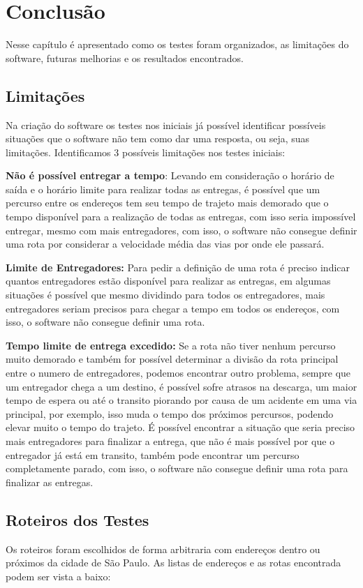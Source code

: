 \chapter{Conclusão}
Nesse capítulo é apresentado como os testes foram organizados, as limitações do software, futuras melhorias e os resultados encontrados.

\section{Limitações}
Na criação do software os testes nos iniciais já possível identificar possíveis situações que o software não tem como dar uma resposta, ou seja, suas limitações.
Identificamos 3 possíveis limitações nos testes iniciais:  

\textbf{Não é possível entregar a tempo}: Levando em consideração o horário de saída e o horário limite para realizar todas as entregas, é possível que um percurso entre os endereços tem seu tempo de trajeto mais demorado que o tempo disponível para a realização de todas as entregas, com isso seria impossível entregar, mesmo com mais entregadores, com isso, o software não consegue definir uma rota por considerar a velocidade média das vias por onde ele passará.

\textbf{Limite de Entregadores:} Para pedir a definição de uma rota é preciso indicar quantos entregadores estão disponível para realizar as entregas, em algumas situações é possível que mesmo dividindo para todos os entregadores, mais entregadores seriam precisos para chegar a tempo em todos os endereços, com isso, o software não consegue definir uma rota.

\textbf{Tempo limite de entrega excedido:} Se a rota não tiver nenhum percurso muito demorado e também for possível determinar a divisão da rota principal entre o numero de entregadores, podemos encontrar outro problema, sempre que um entregador chega a um destino, é possível sofre atrasos na descarga, um maior tempo de espera ou até o transito piorando por causa de um acidente em uma via principal, por exemplo, isso muda o tempo dos próximos percursos, podendo elevar muito o tempo do trajeto.
É possível encontrar a situação que seria preciso mais entregadores para finalizar a entrega, que não é mais possível por que o entregador já está em transito, também pode encontrar um percurso completamente parado,  com isso, o software não consegue definir uma rota para finalizar as entregas.

\section{Roteiros dos Testes}
Os roteiros foram escolhidos de forma arbitraria com endereços dentro ou próximos da cidade de São Paulo. As listas de endereços e as rotas encontrada podem ser vista a baixo:


